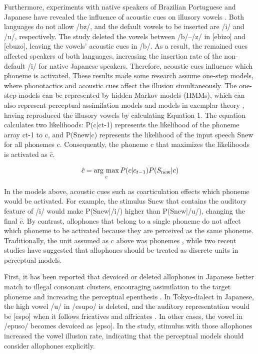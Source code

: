 \documentclass[a4paper,11pt,twocolumn]{article}
\newcommand{\argmax}{\mathop{\rm arg~max}\limits}
\begin{document}
Furthermore, experiments with native speakers of Brazilian Portuguese and Japanese have revealed the influence of acoustic cues on illusory vowels \cite{dupoux2011illusory}. Both languages do not allow /bz/, and the default vowels to be inserted are /i/ and /u/, respectively. The study deleted the vowels between /b/--/z/ in [ebizo] and [ebuzo], leaving the vowels' acoustic cues in /b/. As a result, the remained cues affected speakers of both languages, increasing the insertion rate of the non-default /i/ for native Japanese speakers. Therefore, acoustic cues influence which phoneme is activated.
These results made some research assume one-step models, where phonotactics and acoustic cues affect the illusion simultaneously. The one-step models can be represented by hidden Markov models (HMMs), which can also represent perceptual assimilation models \cite{best2001discrimination} and models in exemplar theory \cite{lacerda1995perceptual}, having reproduced the illusory vowels \cite{kishiyama2021influence} by calculating Equation 1. The equation calculates two likelihoods: P(c|ct-1) represents the likelihood of the phoneme array ct-1 to c, and P(Snew|c) represents the likelihood of the input speech Snew for all phonemes c. Consequently, the phoneme c that maximizes the likelihoods is activated as $\hat{c}$.

\begin{equation} \label{hmm}
    \hat{c} = \argmax_{c} P(c | c_{t-1})P(S_{\text{new}}|c)
\end{equation}

In the models above, acoustic cues such as coarticulation effects which phoneme would be activated. For example, the stimulus Snew that contains the auditory feature of /i/ would make P(Snew|/i/) higher than P(Snew|/u/), changing the final $\hat{c}$. By contrast, allophones that belong to a single phoneme do not affect which phoneme to be activated because they are perceived as the same phoneme. Traditionally, the unit assumed as c above was phonemes \cite{wilson2013bayesian}, while two recent studies have suggested that allophones should be treated as discrete units in perceptual models.

First, it has been reported that devoiced or deleted allophones in Japanese better match to illegal consonant clusters, encouraging assimilation to the target phoneme and increasing the perceptual epenthesis \cite{kilpatrick2018japanese}. In Tokyo-dialect in Japanese, the high vowel /u/ in /esupo/ is deleted, and the auditory representation would be [espo] when it follows fricatives and affricates \cite{fujimoto2003devoice_eng, shaw2018lingual}. In other cases, the vowel in /epuso/ becomes devoiced as [ep\textsubring{\textturnm}so]. In the study, stimulus with those allophones increased the vowel illusion rate, indicating that the perceptual models should consider allophones explicitly. 
\end{document}

